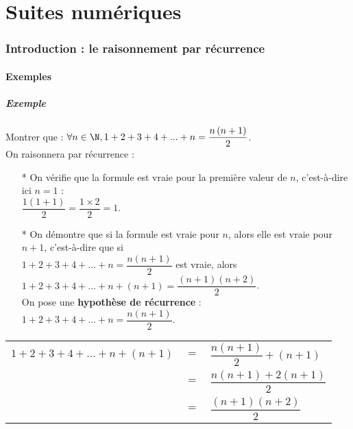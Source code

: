 \vspace*{-1cm}

\part{Suites numériques}

\section{Introduction : le raisonnement par récurrence}

\subsection{Exemples}

\subsubsection{Exemple }

Montrer que : $\forall n \in \N, 1 + 2 + 3 + 4 + ... + n = \dfrac{n\left(n+1\right)}{2}$. \\

On raisonnera par récurrence :

\begin{itemize}

\item[*] On vérifie que la formule est vraie pour la première valeur de $n$, c'est-à-dire ici $n = 1$ : \vspace{.3cm} \\ $\dfrac{1\left(1+1\right)}{2} = \dfrac{1\times 2}{2} = 1$. \\

\item[*] On démontre que si la formule est vraie pour $n$, alors elle est vraie pour $n+1$, c'est-à-dire que si \\ $1 + 2 + 3 + 4 + ... + n = \dfrac{n\left(n+1\right)}{2}$ est vraie, alors $1 + 2 + 3 + 4 + ... + n + \left(n + 1\right) = \dfrac{\left(n+1\right)\left(n+2\right)}{2}$. \vspace{.3cm} \\ On pose une \textbf{hypothèse de récurrence} : $1 + 2 + 3 + 4 + ... + n = \dfrac{n\left(n+1\right)}{2}$.
\end{itemize}

\vspace*{.3cm}

\begin{tabular}{lll}
$1 + 2 + 3 + 4 + ... + n + \left(n+1\right)$ & $ = $ & $ \dfrac{n\left(n+1\right)}{2} + \left(n+1\right)$ \vspace*{.3cm} \\
& $=$ & $\dfrac{n\left(n+1\right) + 2\left(n+1\right)}{2}$ \vspace*{.3cm} \\
& $=$ & $\dfrac{\left(n+1\right)\left(n+2\right)}{2}$ \vspace*{.3cm} \\
\end{tabular}

